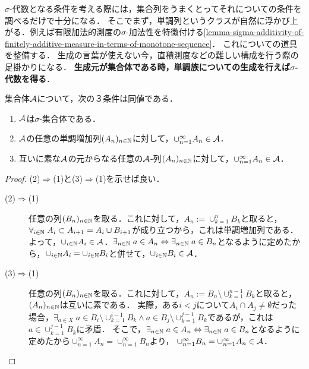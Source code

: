 \documentclass[uplatex, dvipdfmx]{jsreport}
\begin{document}
\begin{tcolorbox}[colframe=ForestGreen, colback=ForestGreen!10!white,breakable,colbacktitle=ForestGreen!40!white,coltitle=black,fonttitle=\bfseries\sffamily,
title=単調族でもある代数は$\sigma$-代数である]
    $\sigma$-代数となる条件を考える際には，集合列をうまくとってそれについての条件を調べるだけで十分になる．
    そこでまず，単調列というクラスが自然に浮かび上がる．例えば有限加法的測度の$\sigma$-加法性を特徴付ける\ref{lemma-sigma-additivity-of-finitely-additive-measure-in-terms-of-monotone-sequence}．
    これについての道具を整備する．
    生成の言葉が使えない今，直積測度などの難しい構成を行う際の足掛かりになる．
    \textbf{生成元が集合体である時，単調族についての生成を行えば$\sigma$-代数を得る}．
\end{tcolorbox}

\begin{theorem}\label{thm-characterization-of-sigma-additivity}
    集合体$\mathcal{A}$について，次の３条件は同値である．
    \begin{enumerate}
        \item $\mathcal{A}$は$\sigma$-集合体である．
        \item $\mathcal{A}$の任意の単調増加列$(A_n)_{n\in\mathbb{N}}$に対して，$\cup_{n=1}^\infty A_n\in\mathcal{A}$．
        \item 互いに素な$\mathcal{A}$の元からなる任意の$\mathcal{A}$-列$(A_n)_{n\in\mathbb{N}}$に対して，$\cup^\infty_{n=1}A_n\in\mathcal{A}$．
    \end{enumerate}
\end{theorem}
\begin{proof}
    (2)$\Rightarrow$(1)と(3)$\Rightarrow$(1)を示せば良い．
    \begin{description}
        \item[(2)$\Rightarrow$(1)] 
        任意の列$(B_n)_{n\in\mathbb{N}}$を取る．これに対して，$A_n:=\cup_{k=1}^nB_k$と取ると，$\forall_{i\in\mathbb{N}}\;A_i\subset A_{i+1}=A_i\cup B_{i+1}$が成り立つから，これは単調増加列である．
        よって，$\cup_{i\in\mathbb{N}}A_i\in\mathcal{A}$．$\exists_{n\in\mathbb{N}}\;a\in A_n\Leftrightarrow\exists_{n\in\mathbb{N}}\;a\in B_n$となるように定めたから，$\cup_{i\in\mathbb{N}}A_i=\cup_{i\in\mathbb{N}}B_i$と併せて，$\cup_{i\in\mathbb{N}}B_i\in\mathcal{A}$．
        \item[(3)$\Rightarrow$(1)]
        任意の列$(B_n)_{n\in\mathbb{N}}$を取る．これに対して，$A_n:=B_n\setminus\cup_{k=1}^{n-1}B_k$と取ると，$(A_n)_{n\in\mathbb{N}}$は互いに素である．
        実際，ある$i<j$について$A_i\cap A_j\ne\emptyset$だった場合，$\exists_{a\in X}\;a\in B_i\setminus\cup_{k=1}^{i-1}B_k\land a\in B_j\setminus\cup^{j-1}_{k=1}B_k$であるが，これは$a\in\cup^{j-1}_{k=1}B_k$に矛盾．
        そこで，$\exists_{n\in\mathbb{N}}\;a\in A_n\Leftrightarrow\exists_{n\in\mathbb{N}}\;a\in B_n$となるように定めたから$\cup^\infty_{n=1}A_n=\cup^\infty_{n=1}B_n$より，
        $\cup_{n=1}^\infty B_n=\cup_{n=1}^\infty A_n\in\mathcal{A}$．
    \end{description}
\end{proof}
\end{document}
